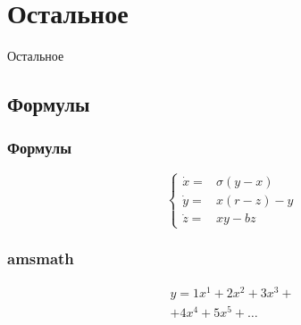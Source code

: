 \section{Остальное}
\begin{frame}
    \begin{center}
        \Huge
        Остальное
    \end{center}
\end{frame}

\subsection{Формулы}

\begin{frame}
    \frametitle{Формулы}
    \[
    \left\{
    \begin{array}{rl}
        \dot x = & \sigma (y-x)  \\
        \dot y = & x (r - z) - y \\
        \dot z = & xy - bz
    \end{array}
    \right.
    \]
\end{frame}

\begin{frame}
    \frametitle{amsmath}
    \centering
    \begin{minipage}[t]{0.5\linewidth}
        \begin{multline*}
            y = 1 x^1 + 2 x^2 + 3 x^3 + \\ + 4 x^4 + 5 x^5 + \dots
        \end{multline*}
    \end{minipage}
\end{frame}

